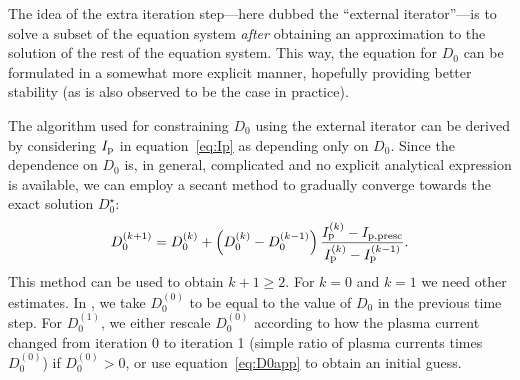 \documentclass{notes}
\begin{document}
	The idea of the extra iteration step---here dubbed the ``external
	iterator''---is to solve a subset of the equation system \emph{after}
	obtaining an approximation to the solution of the rest of the equation
	system. This way, the equation for $D_0$ can be formulated in a somewhat
	more explicit manner, hopefully providing better stability (as is also
	observed to be the case in practice).

	The algorithm used for constraining $D_0$ using the external iterator can
	be derived by considering $I_{\rm p}$ in equation~\eqref{eq:Ip} as
	depending only on $D_0$. Since the dependence on $D_0$ is, in general,
	complicated and no explicit analytical expression is available, we can
	employ a secant method to gradually converge towards the exact solution
	$D_0^\star$:
	\begin{equation}
		D_0^{(k+1)} = D_0^{(k)} +
			\left(D_0^{(k)} - D_0^{(k-1)}\right)
			\frac{I_{\rm p}^{(k)}-I_{\rm p,presc}}{I_{\rm p}^{(k)}-I_{\rm p}^{(k-1)}}.
	\end{equation}
	This method can be used to obtain $k+1\geq 2$. For $k=0$ and $k=1$ we need
	other estimates. In \DREAM, we take $D_0^{(0)}$ to be equal to the value of
	$D_0$ in the previous time step. For $D_0^{(1)}$, we either rescale
	$D_0^{(0)}$ according to how the plasma current changed from iteration 0 to
	iteration 1 (simple ratio of plasma currents times $D_0^{(0)}$) if
	$D_0^{(0)} > 0$, or use equation~\eqref{eq:D0app} to obtain an initial guess.
\end{document}
